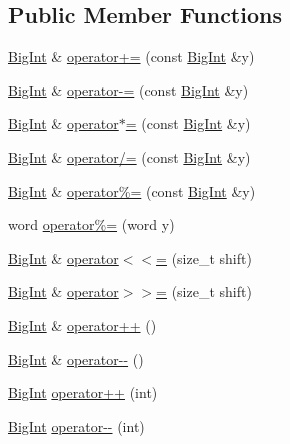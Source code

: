 \subsection*{Public Member Functions}
\begin{DoxyCompactItemize}
\item 
\hyperlink{classBotan_1_1BigInt}{Big\-Int} \& \hyperlink{classBotan_1_1BigInt_ab5471fc3aa9b8bff79e4cd7f07134918}{operator+=} (const \hyperlink{classBotan_1_1BigInt}{Big\-Int} \&y)
\item 
\hyperlink{classBotan_1_1BigInt}{Big\-Int} \& \hyperlink{classBotan_1_1BigInt_a89c2e0aefc13360f716a63f250268b77}{operator-\/=} (const \hyperlink{classBotan_1_1BigInt}{Big\-Int} \&y)
\item 
\hyperlink{classBotan_1_1BigInt}{Big\-Int} \& \hyperlink{classBotan_1_1BigInt_a640794d3a076d7499a61e9abf072e3ee}{operator$\ast$=} (const \hyperlink{classBotan_1_1BigInt}{Big\-Int} \&y)
\item 
\hyperlink{classBotan_1_1BigInt}{Big\-Int} \& \hyperlink{classBotan_1_1BigInt_a10e8c2da50f21f4e340a7c0b4dc53712}{operator/=} (const \hyperlink{classBotan_1_1BigInt}{Big\-Int} \&y)
\item 
\hyperlink{classBotan_1_1BigInt}{Big\-Int} \& \hyperlink{classBotan_1_1BigInt_ab72edfef8899bcadb24f1ebb48802548}{operator\%=} (const \hyperlink{classBotan_1_1BigInt}{Big\-Int} \&y)
\item 
word \hyperlink{classBotan_1_1BigInt_a1178118187a66f4e11f6d89c21b4d75e}{operator\%=} (word y)
\item 
\hyperlink{classBotan_1_1BigInt}{Big\-Int} \& \hyperlink{classBotan_1_1BigInt_acd4eb49cfea62c6ba28b3b29ffe82065}{operator$<$$<$=} (size\-\_\-t shift)
\item 
\hyperlink{classBotan_1_1BigInt}{Big\-Int} \& \hyperlink{classBotan_1_1BigInt_a06f31640f74cc958da2680bcccc3c4ec}{operator$>$$>$=} (size\-\_\-t shift)
\item 
\hyperlink{classBotan_1_1BigInt}{Big\-Int} \& \hyperlink{classBotan_1_1BigInt_a7c7e354ba7eec12dcaaff23e34e3a6d4}{operator++} ()
\item 
\hyperlink{classBotan_1_1BigInt}{Big\-Int} \& \hyperlink{classBotan_1_1BigInt_a8377662fd3eb05fd237a99f36f5e8856}{operator-\/-\/} ()
\item 
\hyperlink{classBotan_1_1BigInt}{Big\-Int} \hyperlink{classBotan_1_1BigInt_ae02116152789cfcb7086ff7e728ef5bb}{operator++} (int)
\item 
\hyperlink{classBotan_1_1BigInt}{Big\-Int} \hyperlink{classBotan_1_1BigInt_aa7795d8efad4def7019ece83a8413c9d}{operator-\/-\/} (int)

\end{DoxyCompactItemize}
